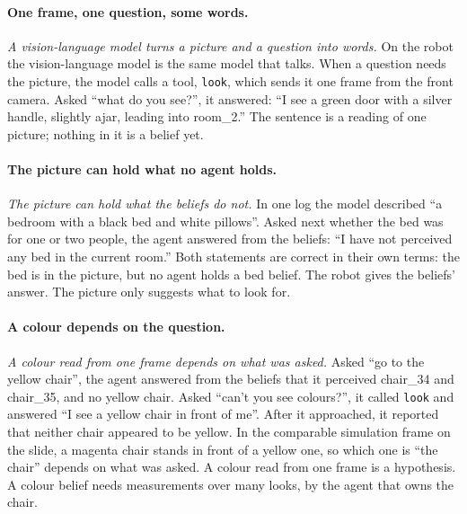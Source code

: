 \documentclass[11pt]{article}
\newcommand{\slt}[1]{\emph{#1}}   %
\begin{document}
\paragraph{One frame, one question, some words.} \slt{A vision-language model turns a picture and a question into words.} On the robot the vision-language model is the same model that talks. When a question needs the picture, the model calls a tool, \texttt{look}, which sends it one frame from the front camera. Asked ``what do you see?'', it answered: ``I see a green door with a silver handle, slightly ajar, leading into room\_2.'' The sentence is a reading of one picture; nothing in it is a belief yet.

\paragraph{The picture can hold what no agent holds.} \slt{The picture can hold what the beliefs do not.} In one log the model described ``a bedroom with a black bed and white pillows''. Asked next whether the bed was for one or two people, the agent answered from the beliefs: ``I have not perceived any bed in the current room.'' Both statements are correct in their own terms: the bed is in the picture, but no agent holds a bed belief. The robot gives the beliefs' answer. The picture only suggests what to look for.

\paragraph{A colour depends on the question.} \slt{A colour read from one frame depends on what was asked.} Asked ``go to the yellow chair'', the agent answered from the beliefs that it perceived chair\_34 and chair\_35, and no yellow chair. Asked ``can't you see colours?'', it called \texttt{look} and answered ``I see a yellow chair in front of me''. After it approached, it reported that neither chair appeared to be yellow. In the comparable simulation frame on the slide, a magenta chair stands in front of a yellow one, so which one is ``the chair'' depends on what was asked. A colour read from one frame is a hypothesis. A colour belief needs measurements over many looks, by the agent that owns the chair.
\end{document}
